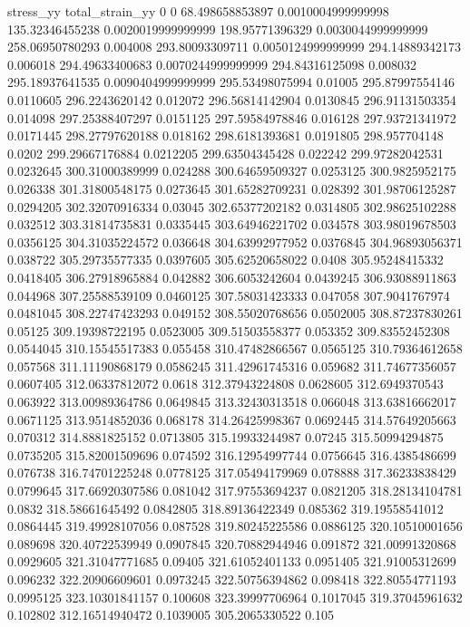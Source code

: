 stress_yy total_strain_yy
0 0
68.498658853897 0.0010004999999998
135.32346455238 0.0020019999999999
198.95771396329 0.0030044999999999
258.06950780293 0.004008
293.80093309711 0.0050124999999999
294.14889342173 0.006018
294.49633400683 0.0070244999999999
294.84316125098 0.008032
295.18937641535 0.0090404999999999
295.53498075994 0.01005
295.87997554146 0.0110605
296.2243620142 0.012072
296.56814142904 0.0130845
296.91131503354 0.014098
297.25388407297 0.0151125
297.59584978846 0.016128
297.93721341972 0.0171445
298.27797620188 0.018162
298.6181393681 0.0191805
298.957704148 0.0202
299.29667176884 0.0212205
299.63504345428 0.022242
299.97282042531 0.0232645
300.31000389999 0.024288
300.64659509327 0.0253125
300.9825952175 0.026338
301.31800548175 0.0273645
301.65282709231 0.028392
301.98706125287 0.0294205
302.32070916334 0.03045
302.65377202182 0.0314805
302.98625102288 0.032512
303.31814735831 0.0335445
303.64946221702 0.034578
303.98019678503 0.0356125
304.31035224572 0.036648
304.63992977952 0.0376845
304.96893056371 0.038722
305.29735577335 0.0397605
305.62520658022 0.0408
305.95248415332 0.0418405
306.27918965884 0.042882
306.6053242604 0.0439245
306.93088911863 0.044968
307.25588539109 0.0460125
307.58031423333 0.047058
307.9041767974 0.0481045
308.22747423293 0.049152
308.55020768656 0.0502005
308.87237830261 0.05125
309.19398722195 0.0523005
309.51503558377 0.053352
309.83552452308 0.0544045
310.15545517383 0.055458
310.47482866567 0.0565125
310.79364612658 0.057568
311.11190868179 0.0586245
311.42961745316 0.059682
311.74677356057 0.0607405
312.06337812072 0.0618
312.37943224808 0.0628605
312.6949370543 0.063922
313.00989364786 0.0649845
313.32430313518 0.066048
313.63816662017 0.0671125
313.9514852036 0.068178
314.26425998367 0.0692445
314.57649205663 0.070312
314.8881825152 0.0713805
315.19933244987 0.07245
315.50994294875 0.0735205
315.82001509696 0.074592
316.12954997744 0.0756645
316.4385486699 0.076738
316.74701225248 0.0778125
317.05494179969 0.078888
317.36233838429 0.0799645
317.66920307586 0.081042
317.97553694237 0.0821205
318.28134104781 0.0832
318.58661645492 0.0842805
318.89136422349 0.085362
319.19558541012 0.0864445
319.49928107056 0.087528
319.80245225586 0.0886125
320.10510001656 0.089698
320.40722539949 0.0907845
320.70882944946 0.091872
321.00991320868 0.0929605
321.31047771685 0.09405
321.61052401133 0.0951405
321.91005312699 0.096232
322.20906609601 0.0973245
322.50756394862 0.098418
322.80554771193 0.0995125
323.10301841157 0.100608
323.39997706964 0.1017045
319.37045961632 0.102802
312.16514940472 0.1039005
305.2065330522 0.105
